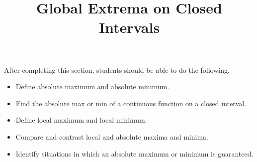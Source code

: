 \documentclass{ximera}
\title{Global Extrema on Closed Intervals}
\begin{document}
\begin{abstract}
\end{abstract}

\maketitle

\begin{sectionOutcomes}

After completing this section, students should be able to do the following.

\begin{itemize}
\item Define absolute maximum and absolute minimum.
	\item Find the absolute max or min of a continuous function on a closed interval.
	\item Define local maximum and local minimum.
	\item Compare and contrast local and absolute maxima and minima.
	\item Identify situations in which an absolute maximum or minimum is guaranteed.
\end{itemize}

\end{sectionOutcomes}
\end{document}
